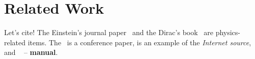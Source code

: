 \chapter{Related Work}
Let's cite! The Einstein's journal paper~\cite{einstein} and the Dirac's 
book~\cite{dirac} are physics-related items. The~\cite{Chien_2019} is a conference paper, \cite{cpu_freq} is an example of the \textit{Internet source}, and ~\cite{gpudirect} -- \textbf{manual}.